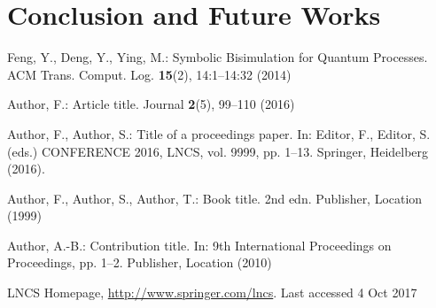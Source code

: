 \documentclass[runningheads]{llncs}
\begin{document}
\section{Conclusion and Future Works}


%
%
% 
% 
%
\begin{thebibliography}{8}
Feng, Y., Deng, Y., Ying, M.: Symbolic Bisimulation for Quantum Processes. ACM Trans. Comput. Log. \textbf{15}(2), 14:1--14:32 (2014)


Author, F.: Article title. Journal \textbf{2}(5), 99--110 (2016)

Author, F., Author, S.: Title of a proceedings paper. In: Editor,
F., Editor, S. (eds.) CONFERENCE 2016, LNCS, vol. 9999, pp. 1--13.
Springer, Heidelberg (2016). 

Author, F., Author, S., Author, T.: Book title. 2nd edn. Publisher,
Location (1999)

Author, A.-B.: Contribution title. In: 9th International Proceedings
on Proceedings, pp. 1--2. Publisher, Location (2010)

LNCS Homepage, \url{http://www.springer.com/lncs}. Last accessed 4
Oct 2017
\end{thebibliography}
\end{document}
